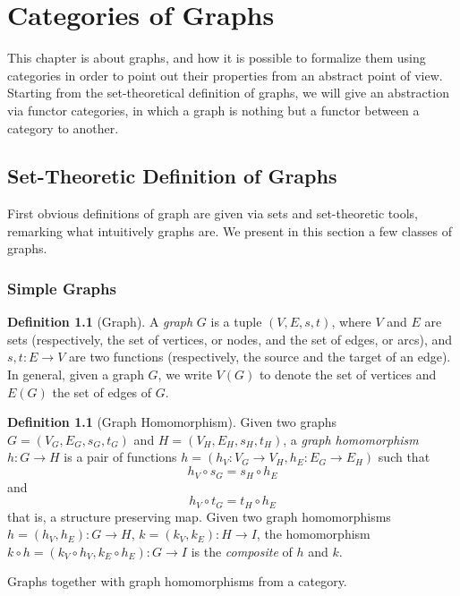 \documentclass[a4paper, twoside,openright]{report}
\theoremstyle{plain}
\theoremstyle{definition}
\newtheorem{definition}[theorem]{Definition}
\begin{document}
\chapter{Categories of Graphs}
This chapter is about graphs, and how it is possible to formalize them using categories in order to point out their properties from an abstract point of view. Starting from the set-theoretical definition of graphs, we will give an abstraction via functor categories, in which a graph is nothing but a functor between a category to another.

\section{Set-Theoretic Definition of Graphs}

First obvious definitions of graph are given via sets and set-theoretic tools, remarking what intuitively graphs are. We present in this section a few classes of graphs.

\subsection{Simple Graphs}

\begin{definition}[Graph]
    A \emph{graph} $G$ is a tuple $(V, E, s, t)$, where $V$ and $E$ are sets (respectively, the set of vertices, or nodes, and the set of edges, or arcs), and $s, t: E \rightarrow V$ are two functions (respectively, the source and the target of an edge).
    In general, given a graph $G$, we write $V(G)$ to denote the set of vertices and $E(G)$ the set of edges of $G$.
\end{definition}

\begin{definition}[Graph Homomorphism]
    Given two graphs $G=(V_G, E_G, s_G, t_G)$ and $H=(V_H, E_H, s_H, t_H)$, a \emph{graph homomorphism} $h: G \rightarrow H$ is a pair of functions $h = (h_V: V_G \rightarrow V_H, h_E: E_G \rightarrow E_H)$ such that
    \[
        h_V \circ s_G = s_H \circ h_E
    \]
    and
    \[
        h_V \circ t_G = t_H \circ h_E
    \]
    that is, a structure preserving map.
    Given two graph homomorphisms $h = (h_V, h_E): G \rightarrow H$, $k = (k_V, k_E): H \rightarrow I$, the homomorphism $ k \circ h = (k_V \circ h_V, k_E \circ h_E): G \rightarrow I$ is the \emph{composite} of $h$ and $k$.
\end{definition}

Graphs together with graph homomorphisms from a category.
\end{document}
